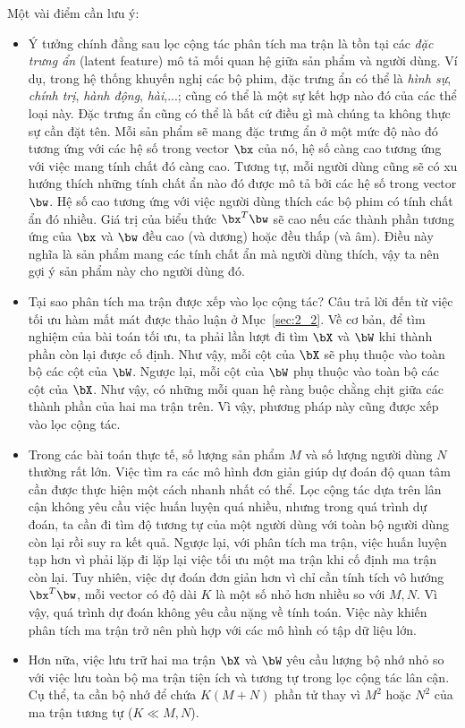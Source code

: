 Một vài điểm cần lưu ý:  
\begin{itemize}
    \item Ý tưởng chính đằng sau lọc cộng tác phân tích ma trận
    là tồn tại các \textit{đặc trưng ẩn} ({latent feature}) mô tả mối quan hệ
    giữa sản phẩm và người dùng. Ví dụ, trong hệ thống khuyến nghị các bộ phim,
    đặc trưng ẩn có thể là \textit{hình sự}, \textit{chính trị}, \textit{hành
    động}, \textit{hài},...; cũng có thể là một sự kết hợp nào đó của các thể
    loại này. Đặc trưng ẩn cũng có thể là bất cứ điều gì mà chúng ta không thực
    sự cần đặt tên. Mỗi sản phẩm sẽ mang đặc trưng ẩn ở một mức độ nào đó tương
    ứng với các hệ số trong vector $\bx$ của nó, hệ số càng cao tương ứng với
    việc mang tính chất đó càng cao. Tương tự, mỗi người dùng cũng sẽ có xu
    hướng thích những tính chất ẩn nào đó được mô tả bởi các hệ số trong
    vector $\bw$. Hệ số cao tương ứng với việc người dùng thích các bộ phim có
    tính chất ẩn đó nhiều. Giá trị của biểu thức $\bx^T\bw$ sẽ cao nếu các thành phần
    tương ứng của $\bx$ và $\bw$ đều cao (và dương) hoặc đều thấp (và âm). Điều này nghĩa là sản phẩm
    mang các tính chất ẩn mà người dùng thích, vậy ta nên gợi ý sản phẩm này cho
    người dùng đó.
     
    \item Tại sao phân tích ma trận được xếp vào lọc cộng tác?
    Câu trả lời đến từ việc tối ưu hàm mất mát được thảo luận ở
    Mục~\ref{sec:2_2}. Về cơ bản, để tìm nghiệm của bài toán tối ưu, ta phải lần
    lượt đi tìm $\bX$ và $\bW$ khi thành phần còn lại được cố
    định. Như vậy, mỗi cột của $\bX$ sẽ phụ thuộc vào toàn bộ các cột
    của $\bW$. Ngược lại, mỗi cột của $\bW$ phụ thuộc vào
    toàn bộ các cột của $\bX$. Như vậy, có những mỗi quan hệ ràng buộc
    {chằng chịt} giữa các thành phần của hai ma trận trên. Vì vậy, phương pháp này
    cũng được xếp vào lọc cộng tác. 
     
    \item Trong các bài toán thực tế, số lượng sản phẩm $M$ và số lượng
    người dùng $N$ thường rất lớn. Việc tìm ra các mô hình đơn giản giúp dự
    đoán độ quan tâm cần được thực hiện một cách nhanh nhất có thể.
    Lọc cộng tác dựa trên lân cận không yêu cầu việc huấn luyện quá
    nhiều, nhưng trong quá trình dự đoán, ta cần đi tìm độ tương tự của một người dùng với toàn bộ
    người dùng còn lại rồi suy ra kết quả. Ngược lại, với phân tích ma trận, việc huấn luyện tạp hơn vì phải
    lặp đi lặp lại việc tối ưu một ma trận khi cố định ma trận còn lại. Tuy nhiên,
    việc dự đoán đơn giản hơn vì chỉ cần tính tích vô hướng
    $\bx^T\bw$, mỗi vector có độ dài $K$ là một số nhỏ hơn nhiều so với
    $M, N$. Vì vậy, quá trình dự đoán không yêu cầu nặng về tính toán. Việc này khiến phân tích ma trận trở nên phù hợp với các mô hình có tập dữ liệu lớn.
     
    \item Hơn nữa, việc lưu trữ hai ma trận $\bX$ và $\bW$ yêu
    cầu lượng bộ nhớ nhỏ so với việc lưu toàn bộ ma trận tiện ích và 
    tương tự trong lọc cộng tác lân cận. Cụ thể, ta cần
    bộ nhớ để chứa $K(M+N)$ phần tử thay vì $M^2$ hoặc $N^2$ của ma trận
    tương tự ($K \ll M, N$).  
\end{itemize}
 
